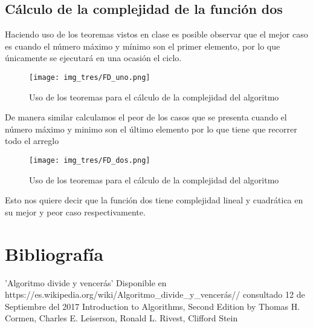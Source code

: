 \documentclass[12pt,twoside]{article}
\begin{document}
\subsection{Cálculo de la complejidad de la función dos}
 Haciendo uso de los teoremas vistos en clase es posible observar que el mejor caso es cuando el número máximo y mínimo son el primer elemento, por lo que únicamente se ejecutará en una ocasión el ciclo.\\
\begin{figure}[H]
\centering
\texttt{[image: img\_tres/FD\_uno.png]}
\caption{Uso de los teoremas para el cálculo de la complejidad del algoritmo}
\label{ejecucionEuclides}
\end{figure}
\vspace{10 mm}
De manera similar calculamos el peor de los casos que se presenta cuando el número máximo y minimo son el último elemento por lo que tiene que recorrer todo el arreglo\\
\begin{figure}[h]
\centering
\texttt{[image: img\_tres/FD\_dos.png]}
\caption{Uso de los teoremas para el cálculo de la complejidad del algoritmo}
\label{ejecucionEuclides}
\end{figure}
\vspace{5 mm}
Esto nos quiere decir que la función dos tiene complejidad lineal y cuadrática en su mejor y peor caso respectivamente.
\section{Bibliograf\'ia}
\begin{thebibliography}{9}
 'Algoritmo divide y vencerás' Disponible en \\
 https://es.wikipedia.org/wiki/Algoritmo\_divide\_y\_vencerás// consultado 12 de Septiembre del 2017
 Introduction to Algorithms, Second Edition by Thomas H. Cormen, Charles E. Leiserson, Ronald L. Rivest, Clifford Stein
  
\end{thebibliography}
\end{document}
